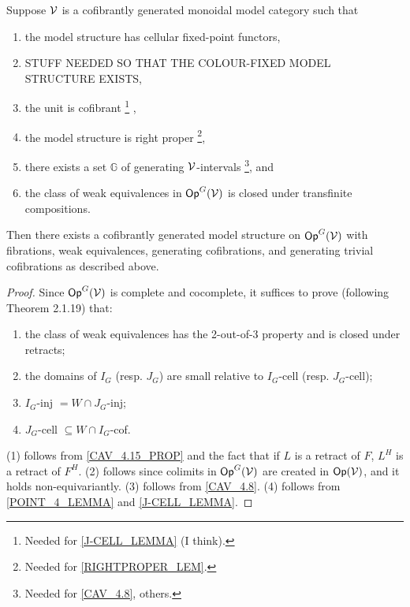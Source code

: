 \documentclass[psamsfonts,oneside,10pt,letterpaper
,draft
]{amsart}%
\renewcommand{\1}{\ensuremath{\mathbb{id}}}
\begin{document}
\begin{theorem}
      \label{MODEL_THEOREM}
      Suppose $\mathcal V$ is a cofibrantly generated monoidal model category such that
      \begin{enumerate}
      \item the model structure has cellular fixed-point functors,
      \item STUFF NEEDED SO THAT THE COLOUR-FIXED MODEL STRUCTURE EXISTS,
      \item the unit is cofibrant
            \footnote{Needed for \ref{J-CELL_LEMMA} (I think).} ,
      \item the model structure is right proper
            \footnote{Needed for \ref{RIGHTPROPER_LEM}.},
      \item there exists a set $\mathbb{G}$ of generating $\mathcal V$-intervals
            \footnote{Needed for \ref{CAV_4.8}, others.}, and
      \item the class of weak equivalences in $\mathsf{Op}^G(\mathcal V)$ is closed under transfinite compositions.
      \end{enumerate}
      Then there exists a cofibrantly generated model structure on $\mathsf{Op}^G(\mathcal V)$ with
      fibrations, weak equivalences, generating cofibrations, and generating trivial cofibrations as described above.
\end{theorem}
\begin{proof}
      Since $\mathsf{Op}^G(\mathcal V)$ is complete and cocomplete, it suffices to prove (following \cite{Hov98} Theorem 2.1.19) that:
      \begin{enumerate}
      \item the class of weak equivalences has the 2-out-of-3 property and is closed under retracts;
      \item the domains of $I_{G}$ (resp. $J_{G}$) are small relative to $I_{G}$-cell (resp. $J_{G}$-cell);
      \item $I_{G}$-inj $= W\cap J_{G}$-inj;
      \item $J_{G}$-cell $\subseteq W\cap I_{G}$-cof.
      \end{enumerate}
      (1) follows from \ref{CAV_4.15_PROP} and the fact that if $L$ is a retract of $F$, $L^H$ is a retract of $F^H$.
      (2) follows since colimits in $\mathsf{Op}^G(\mathcal V)$ are created in $\mathsf{Op}(\mathcal V)$, and it holds non-equivariantly.
      (3) follows from \ref{CAV_4.8}.
      (4) follows from \ref{POINT_4_LEMMA} and \ref{J-CELL_LEMMA}.
\end{proof}





{}


\end{document}
